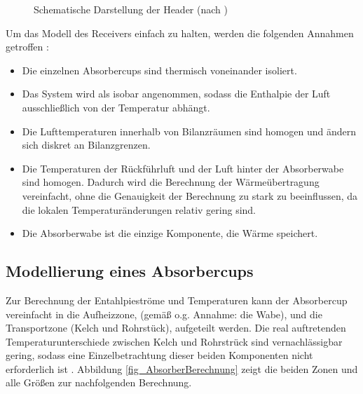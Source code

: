 \begin{figure}[h!]
    \centering
    \setlength{\fboxsep}{8pt}
    \setlength{\fboxrule}{1pt}
    \caption[Schematische Darstellung der Header]{Schematische Darstellung der Header (nach \cite[S.90]{DissGall})}
    \label{fig_HeaderSchema}
\end{figure}

Um das Modell des Receivers einfach zu halten, werden die folgenden Annahmen getroffen \cite[S.92]{DissGall}:
\begin{itemize}
\item Die einzelnen Absorbercups sind thermisch voneinander isoliert.
\item Das System wird als isobar angenommen, sodass die Enthalpie der Luft ausschließlich von der Temperatur abhängt.
    \item Die Lufttemperaturen innerhalb von Bilanzräumen sind homogen und ändern sich diskret an Bilanzgrenzen.
    \item Die Temperaturen der Rückführluft und der Luft hinter der Absorberwabe sind homogen.
Dadurch wird die Berechnung der Wärmeübertragung vereinfacht, ohne die Genauigkeit der Berechnung zu stark zu beeinflussen, da die lokalen Temperaturänderungen relativ gering sind.
    \item Die Absorberwabe ist die einzige Komponente, die Wärme speichert.
\end{itemize}


\subsection{Modellierung eines Absorbercups} \label{subsec_ModellCup}
Zur Berechnung der Entahlpieströme und Temperaturen kann der Absorbercup vereinfacht in die Aufheizzone, (gemäß o.g. Annahme: die Wabe), und die Transportzone (Kelch und Rohrstück), aufgeteilt werden.
Die real auftretenden Temperaturunterschiede zwischen Kelch und Rohrstrück sind vernachlässigbar gering, sodass eine Einzelbetrachtung dieser beiden Komponenten nicht erforderlich ist \cite[S.93]{DissGall}.
Abbildung \ref{fig_AbsorberBerechnung} zeigt die beiden Zonen und alle Größen zur nachfolgenden Berechnung.


